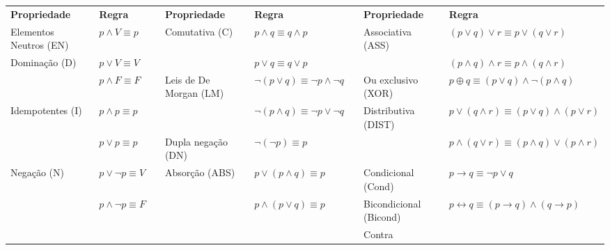 \documentclass[16pt]{examdesign}
\begin{document}
\begin{fillin}[title={},
                    rearrange=no,resetcounter=no,suppressprefix]
\begin{question}
\begin{scriptsize}
\begin{tabular}{|l|l|l|l|l|l|l|l|}
	    \cline{1-2} \cline{4-5} \cline{7-8}
	    \textbf{Propriedade}& \textbf{Regra}		&  	& \textbf{Propriedade}	& \textbf{Regra}				&  & \textbf{Propriedade}& \textbf{Regra} \\ \cline{1-2} \cline{4-5} \cline{7-8}
	   Elementos Neutros (EN)& $p  \land  V \equiv p$        &  	& Comutativa	(C)	& $p \land q \equiv q \land p$			&  & Associativa (ASS)	 &$(p  \lor q) \lor r \equiv p  \lor (q \lor r)$	\\ \cline{1-2} 
	   Dominação	(D)	& $p  \lor  V \equiv V$		&  	&      			& $p \lor q  \equiv q \lor p$     		&  & 			 &$(p  \land q) \land r \equiv p  \land (q \land r)$	\\   \cline{4-5} \cline{7-8}
				& $p  \land F \equiv F$		&  	& Leis de De Morgan (LM)    & $\neg (p \lor q) \equiv \neg p \land \neg q$  &  & Ou exclusivo (XOR)	 &$p \oplus q \equiv (p \lor q) \land \neg (p \land q)$	\\  \cline{1-2}  \cline{7-8}
	 Idempotentes 	(I)	& $p  \land p \equiv p$		&  	&             		& $\neg (p \land q) \equiv \neg p \lor \neg q$  &  & Distributiva (DIST)	 &$p \lor (q \land r) \equiv (p \lor q) \land (p \lor r)$	\\   \cline{4-5} 
				& $p  \lor p \equiv p$		&	& Dupla negação	(DN)	& $\neg (\neg p) \equiv p$			&  & 			 &$p \land (q \lor r) \equiv (p \land q) \lor (p \land r)$	\\ \cline{1-2} \cline{4-5}  \cline{7-8}
	  Negação	(N)	& $p \lor \neg p \equiv V$	&	& Absorção	(ABS)	& $p \lor (p \land q) \equiv p$			&  & Condicional (Cond)	 &$p \to q \equiv \neg p \lor q$	\\ 		 \cline{7-8}
				& $p \land \neg p \equiv F$	&	& 			& $p \land (p \lor q) \equiv p$			&  & Bicondicional (Bicond)	 &$p \leftrightarrow q \equiv (p \to q) \land (q \to p)$	\\\cline{1-2} \cline{4-5} \cline{7-8}
				&				&	&			&						&  & Contra
	    \end{tabular}
	\end{scriptsize}  
    \end{question}

    
    
\end{fillin}
\end{document}

